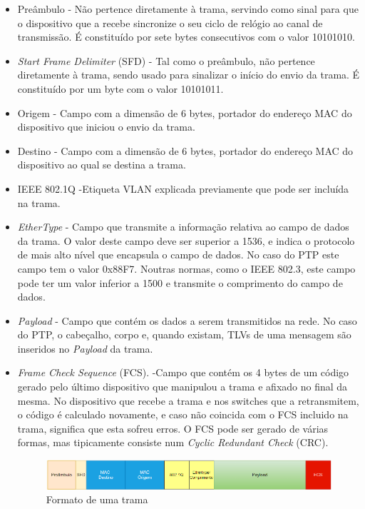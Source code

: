 \begin{itemize}
  \item Preâmbulo  - \quad Não pertence diretamente à trama, servindo como sinal para que o dispositivo que a recebe sincronize o seu ciclo de relógio ao canal de transmissão. É constituído por sete bytes consecutivos com o valor 10101010. 
  \item \textit{Start Frame Delimiter} (SFD)  - \quad Tal como o preâmbulo, não pertence diretamente à trama, sendo usado para sinalizar o início do envio da trama. É constituído por um byte com o valor 10101011.  
  \item Origem  - \quad Campo com a dimensão de 6 bytes, portador do endereço MAC do dispositivo que iniciou o envio da trama.
  \item Destino - \quad Campo com a dimensão de 6 bytes, portador do endereço MAC do dispositivo ao qual se destina a trama.
  \item IEEE 802.1Q -\quad Etiqueta VLAN explicada previamente que pode ser incluída na trama.
  \item \textit{EtherType} - \quad Campo que transmite a informação relativa ao campo de dados da trama. O valor deste campo deve ser superior a 1536, e indica o protocolo de mais alto nível que encapsula o campo de dados. No caso do PTP este campo tem o valor 0x88F7. Noutras normas, como o IEEE 802.3, este campo pode ter um valor inferior a 1500 e transmite o comprimento do campo de dados.
  \item \textit{Payload} - \quad Campo que contém os dados a serem transmitidos na rede. No caso do PTP, o cabeçalho, corpo e, quando existam, TLVs de uma mensagem são inseridos no \textit{Payload} da trama.
  \item \textit{Frame Check Sequence} (FCS). -\quad Campo que contém os 4 bytes de um código gerado pelo último dispositivo que manipulou a trama e afixado no final da mesma. No dispositivo que recebe a trama e nos switches que a retransmitem, o código é calculado novamente, e caso não coincida com o FCS incluido na trama, significa que esta sofreu erros. O FCS pode ser gerado de várias formas, mas tipicamente consiste num \textit{Cyclic Redundant Check} (CRC). 

  

\begin{figure}[H]
  \centering
  \includegraphics[width=1.\textwidth]{trama_best.png}
  \caption[Trama de Ethernet]{Formato de uma trama}
  \label{fig:airbus1}
\end{figure}


  
\end{itemize}


